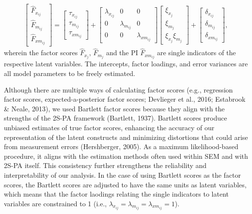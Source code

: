 \documentclass[
  man]{apa6}
\begin{document}
\begin{align}
    \begin{bmatrix}
        \widehat{F}_{x_{ij}} \\ 
        \widehat{F}_{m_{ij}} \\
        \widehat{F}_{xm_{ij}}
    \end{bmatrix} = 
    \begin{bmatrix}
        \tau_{x_{ij}} \\
        \tau_{m_{ij}} \\ 
        \tau_{xm_{ij}} 
    \end{bmatrix} + 
    \begin{bmatrix}
        \lambda_{x_{ij}} & 0 & 0 \\
        0 & \lambda_{m_{ij}} & 0 \\ 
        0 & 0 & \lambda_{xm_{ij}} 
    \end{bmatrix} 
    \begin{bmatrix}
        \xi_{x_{j}} \\
        \xi_{m_{j}} \\
        \xi_{x_{j}}\xi_{m_{j}}
    \end{bmatrix} +
    \begin{bmatrix}
        \delta_{x_{ij}} \\
        \delta_{m_{ij}} \\ 
        \delta_{xm_{ij}}
    \end{bmatrix},
\end{align}
wherein the factor scores \(\hat{F}_{x_{j}}\), \(\hat{F}_{m_{j}}\) and the PI \(\hat{F}_{xm_{ij}}\) are single indicators of the respective latent variables. The intercepts, factor loadings, and error variances are all model parameters to be freely estimated.

Although there are multiple ways of calculating factor scores (e.g., regression factor scores, expected-a-posterior factor scores; Devlieger et al., 2016; Estabrook \& Neale, 2013), we used Bartlett factor scores because they align with the strengths of the 2S-PA framework (Bartlett, 1937). Bartlett scores produce unbiased estimates of true factor scores, enhancing the accuracy of our representation of the latent constructs and minimizing distortions that could arise from measurement errors (Hershberger, 2005). As a maximum likelihood-based procedure, it aligns with the estimation methods often used within SEM and with 2S-PA itself. This consistency further strengthens the reliability and interpretability of our analysis. In the case of using Bartlett scores as the factor scores, the Bartlett scores are adjusted to have the same units as latent variables, which means that the factor laodings relating the single indicators to latent variables are constrained to 1 (i.e., \(\lambda_{x_{ij}} = \lambda_{m_{ij}} = \lambda_{xm_{ij}} = 1\)).
\end{document}
